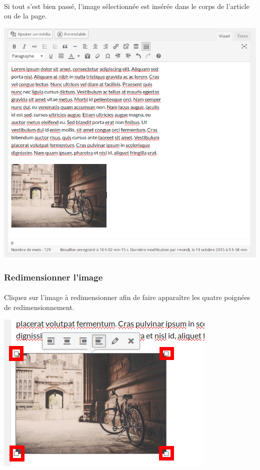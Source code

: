 \documentclass[10pt,a4paper]{article}
\begin{document}
\paragraph{}Si tout s'est bien passé, l'image sélectionnée est insérée dans le corps de l'article ou de la page.
\begin{center}
\includegraphics[scale=0.3]{img/0104.png}
\end{center}
\subsubsection{Redimensionner l'image}
\paragraph{}Cliquez sur l'image à redimensionner afin de faire apparaître les quatre poignées de redimensionnement.
\begin{center}
\includegraphics[scale=0.3]{img/0105.png}
\end{center}
\end{document}
